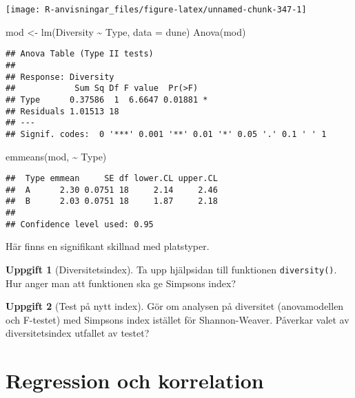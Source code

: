 \documentclass[
]{book}
\newenvironment{Shaded}{\begin{snugshade}}{\end{snugshade}}
\newcommand{\AttributeTok}[1]{\textcolor[rgb]{0.77,0.63,0.00}{#1}}
\newcommand{\FunctionTok}[1]{\textcolor[rgb]{0.00,0.00,0.00}{#1}}
\newcommand{\NormalTok}[1]{#1}
\newcommand{\OtherTok}[1]{\textcolor[rgb]{0.56,0.35,0.01}{#1}}
\newcommand{\SpecialCharTok}[1]{\textcolor[rgb]{0.00,0.00,0.00}{#1}}
\theoremstyle{definition}
\theoremstyle{definition}
\theoremstyle{definition}
\newtheorem{exercise}{Uppgift}[chapter]
\theoremstyle{definition}
\theoremstyle{remark}
\begin{document}
\begin{center}\texttt{[image: R-anvisningar\_files/figure-latex/unnamed-chunk-347-1]} \end{center}

\begin{Shaded}
\begin{Highlighting}[]
\NormalTok{mod }\OtherTok{\textless{}{-}} \FunctionTok{lm}\NormalTok{(Diversity }\SpecialCharTok{\textasciitilde{}}\NormalTok{ Type, }\AttributeTok{data =}\NormalTok{ dune)}
\FunctionTok{Anova}\NormalTok{(mod)}
\end{Highlighting}
\end{Shaded}

\begin{verbatim}
## Anova Table (Type II tests)
## 
## Response: Diversity
##            Sum Sq Df F value  Pr(>F)  
## Type      0.37586  1  6.6647 0.01881 *
## Residuals 1.01513 18                  
## ---
## Signif. codes:  0 '***' 0.001 '**' 0.01 '*' 0.05 '.' 0.1 ' ' 1
\end{verbatim}

\begin{Shaded}
\begin{Highlighting}[]
\FunctionTok{emmeans}\NormalTok{(mod, }\SpecialCharTok{\textasciitilde{}}\NormalTok{ Type)}
\end{Highlighting}
\end{Shaded}

\begin{verbatim}
##  Type emmean     SE df lower.CL upper.CL
##  A      2.30 0.0751 18     2.14     2.46
##  B      2.03 0.0751 18     1.87     2.18
## 
## Confidence level used: 0.95
\end{verbatim}

Här finns en signifikant skillnad med platstyper.

\begin{exercise}[Diversitetsindex]
Ta upp hjälpsidan till funktionen \texttt{diversity()}. Hur anger man att funktionen ska ge Simpsons index?
\end{exercise}

\begin{exercise}[Test på nytt index]
Gör om analysen på diversitet (anovamodellen och F-testet) med Simpsons index istället för Shannon-Weaver. Påverkar valet av diversitetsindex utfallet av testet?
\end{exercise}

\hypertarget{regression-och-korrelation}{%
\chapter{Regression och korrelation}\label{regression-och-korrelation}}
\end{document}
